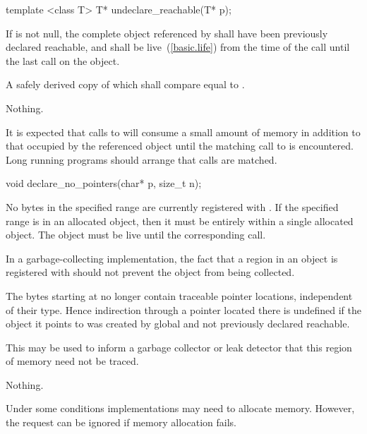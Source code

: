 %
\begin{itemdecl}
template <class T> T* undeclare_reachable(T* p);
\end{itemdecl}

\begin{itemdescr}
\pnum
\requires If  is not null, the complete object referenced by 
shall have been previously declared reachable, and shall be
live~(\ref{basic.life}) from the time of the call until the last
 call on the object.

\pnum
\returns A safely derived copy of  which shall compare equal to .

\pnum
\throws Nothing.

\pnum \begin{note} It is expected that calls to  will consume
a small amount of memory in addition to that occupied by the referenced object until the
matching call to  is encountered. Long running programs
should arrange that calls are matched. \end{note} \end{itemdescr}

%
\begin{itemdecl}
void declare_no_pointers(char* p, size_t n);
\end{itemdecl}

\begin{itemdescr}
\pnum
\requires No bytes in the specified range
are currently registered with
. If the specified range is in an allocated object,
then it must be entirely within a single allocated object. The object must be
live until the corresponding  call. \begin{note} In
a garbage-collecting implementation, the fact that a region in an object is
registered with  should not prevent the object from
being collected. \end{note}

\pnum
\effects The  bytes starting at  no longer contain
traceable pointer locations, independent of their type. Hence
indirection through a pointer located there is undefined if the object
it points to was created by global  and not
previously declared reachable. \begin{note} This may be used to inform a
garbage collector or leak detector that this region of memory need not
be traced. \end{note}

\pnum
\throws Nothing.

\pnum
\begin{note} Under some conditions implementations may need to allocate memory.
However, the request can be ignored if memory allocation fails. \end{note}
\end{itemdescr}

